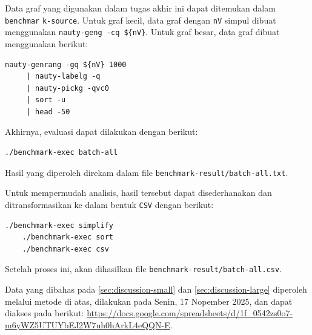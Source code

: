 Data graf yang digunakan dalam tugas akhir ini dapat ditemukan dalam  \verb`benchmar` \verb`k-source`. Untuk graf kecil, data graf dengan \verb`nV` simpul dibuat menggunakan  \verb`nauty-geng -cq ${nV}`. Untuk graf besar, data graf dibuat menggunakan  berikut:
\vspace{-1.375\baselineskip}
\begin{Verbatim}[gobble=1, xleftmargin=2em]
	nauty-genrang -gq ${nV} 1000
	 | nauty-labelg -q
	 | nauty-pickg -qvc0
	 | sort -u
	 | head -50
\end{Verbatim}
\vspace{-.375\baselineskip}
Akhirnya, evaluasi dapat dilakukan dengan  berikut:
\vspace{-.375\baselineskip}
\begin{Verbatim}[gobble=1, xleftmargin=2em]
	./benchmark-exec batch-all
\end{Verbatim}
\vspace{-.375\baselineskip}
Hasil yang diperoleh direkam dalam file \verb`benchmark-result/batch-all.txt`.

Untuk mempermudah analisis, hasil tersebut dapat disederhanakan dan ditransformasikan ke dalam bentuk \verb`CSV` dengan  berikut:
\vspace{-.375\baselineskip}
\begin{Verbatim}[gobble=1, xleftmargin=2em]
	./benchmark-exec simplify
	./benchmark-exec sort
	./benchmark-exec csv
\end{Verbatim}
\vspace{-.375\baselineskip}
Setelah proses ini, akan dihasilkan file \verb`benchmark-result/batch-all.csv`.

Data yang dibahas pada \autoref{sec:discussion-small} dan \autoref{sec:discussion-large} diperoleh melalui metode di atas, dilakukan pada Senin, 17 Nopember 2025, dan dapat diakses pada  berikut: \url{https://docs.google.com/spreadsheets/d/1f_0542zs0o7-m6yWZ5UTUYbEJ2W7uh0hArkL4eQQN-E}.

